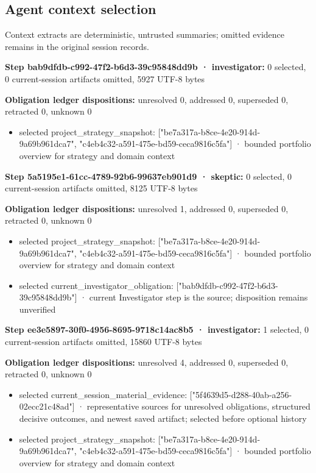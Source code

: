 \documentclass[11pt]{article}
\begin{document}
\subsection{Agent context selection}
Context extracts are deterministic, untrusted summaries; omitted evidence remains in the original session records.\par
\textbf{Step bab9dfdb-c992-47f2-b6d3-39c95848dd9b · investigator:} 0 selected, 0 current-session artifacts omitted, 5927 UTF-8 bytes\par
\textbf{Obligation ledger dispositions:} unresolved 0, addressed 0, superseded 0, retracted 0, unknown 0\par
\begin{itemize}
\item selected project\_strategy\_snapshot: ["be7a317a-b8ce-4e20-914d-9a69b961dca7", "c4eb4c32-a591-475e-bd59-ceca9816c5fa"] · bounded portfolio overview for strategy and domain context
\end{itemize}
\textbf{Step 5a5195e1-61cc-4789-92b6-99637eb901d9 · skeptic:} 0 selected, 0 current-session artifacts omitted, 8125 UTF-8 bytes\par
\textbf{Obligation ledger dispositions:} unresolved 1, addressed 0, superseded 0, retracted 0, unknown 0\par
\begin{itemize}
\item selected project\_strategy\_snapshot: ["be7a317a-b8ce-4e20-914d-9a69b961dca7", "c4eb4c32-a591-475e-bd59-ceca9816c5fa"] · bounded portfolio overview for strategy and domain context
\item selected current\_investigator\_obligation: ["bab9dfdb-c992-47f2-b6d3-39c95848dd9b"] · current Investigator step is the source; disposition remains unverified
\end{itemize}
\textbf{Step ee3e5897-30f0-4956-8695-9718c14ac8b5 · investigator:} 1 selected, 0 current-session artifacts omitted, 15860 UTF-8 bytes\par
\textbf{Obligation ledger dispositions:} unresolved 4, addressed 0, superseded 0, retracted 0, unknown 0\par
\begin{itemize}
\item selected current\_session\_material\_evidence: ["5f4639d5-d288-40ab-a256-02ecc21c48ad"] · representative sources for unresolved obligations, structured decisive outcomes, and newest saved artifact; selected before optional history
\item selected project\_strategy\_snapshot: ["be7a317a-b8ce-4e20-914d-9a69b961dca7", "c4eb4c32-a591-475e-bd59-ceca9816c5fa"] · bounded portfolio overview for strategy and domain context
\end{itemize}
\end{document}
